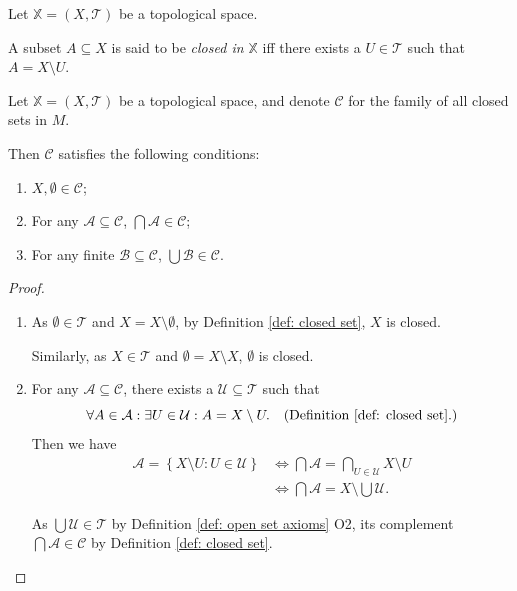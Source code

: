 \begin{definition}
	\label{def: closed set}
	Let $\mathbb X = (X, \mathcal T)$ be a topological space.
	
	A subset $A \subseteq X$ is said to be \textit{closed in $\mathbb X$} iff there exists a $U \in \mathcal T$ such that $A = X \setminus U$.
\end{definition}


\begin{proposition}
	\label{prop: closed set axioms}
	Let $\mathbb X = (X, \mathcal T)$ be a topological space, and denote $\mathcal C$ for the family of all closed sets in $M$.
	
	Then $\mathcal C$ satisfies the following conditions:
	\begin{enumerate}[\bf C1.]
		\item $X, \emptyset \in \mathcal C$;
		\item For any $\mathcal A \subseteq \mathcal C$, $\bigcap \mathcal A \in \mathcal C$;
		\item For any finite $\mathcal B \subseteq \mathcal C$, $\bigcup \mathcal B \in \mathcal C$.
	\end{enumerate}
	
	\begin{proof}
		\begin{enumerate}[\bf C1.]
			\item
			As $\emptyset \in \mathcal T$ and $X = X \setminus \emptyset$, by Definition \ref{def: closed set}, $X$ is closed.
			
			Similarly, as $X \in \mathcal T$ and $\emptyset = X \setminus X$, $\emptyset$ is closed.
			
			\qedlm
			
			\item
			For any $\mathcal A \subseteq \mathcal C$, there exists a $\mathcal U \subseteq \mathcal T$ such that 
			$$
			\forall A \in \mathcal A: \exists U \in \mathcal U : A = X \setminus U. \quad
			\text{(Definition \ref{def: closed set}.)}
			$$
			Then we have
			$$
			\begin{aligned}
				\mathcal A = \left\{ X \setminus U : U \in \mathcal U \right\} &\iff \bigcap \mathcal A = \bigcap_{U \in \mathcal U} X \setminus U \\
				&\iff \bigcap \mathcal A = X \setminus \bigcup \mathcal U.
			\end{aligned}
			$$
			
			As $\bigcup \mathcal U \in \mathcal T$ by Definition \ref{def: open set axioms} O2, its complement $\bigcap \mathcal A \in \mathcal C$ by Definition \ref{def: closed set}.
				

\end{enumerate}
\end{proof}
\end{proposition}
